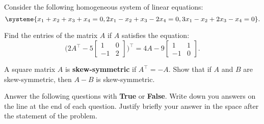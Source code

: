 \documentclass[addpoints, 12pt]{exam}%
\theoremstyle{definition}
\begin{document}
\begin{questions}
\begin{parts}
\end{parts}


\newpage 

\question

Consider the following homogeneous system of linear equations:
  \[
    \systeme{x_1 + x_2 + x_3 + x_4 = 0 , 2x_1 - x_2 + x_3 - 2x_4 = 0 , 3x_1 - x_2 + 2x_3 - x_4 = 0} .
  \]

\newpage 

\question[10] 

Find the entries of the matrix $A$ if $A$ satisfies the equation:
  \[
    \Big( 2A^\top - 5 \begin{bmatrix} 1 & 0 \\ -1 & 2 \end{bmatrix} \Big)^{\top} = 4A - 9 \begin{bmatrix} 1 & 1 \\ -1 & 0 \end{bmatrix} .
  \]


\newpage 

\question[6] 

A square matrix $A$ is \textbf{skew-symmetric} if $A^\top = -A$. Show that if $A$ and $B$ are skew-symmetric, then $A - B$ is skew-symmetric.

\newpage 

\question[4]
\noaddpoints
Answer the following questions with \textbf{True} or \textbf{False}. Write down you answers on the line at the end of each question. Justify briefly your answer in the space after the statement of the problem.


\end{questions}
\end{document}
